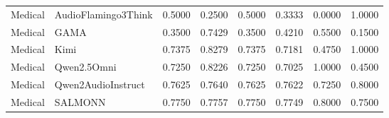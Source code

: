 \begin{table}
\begin{tabular}{llllllll}
Medical & AudioFlamingo3Think & 0.5000 & 0.2500 & 0.5000 & 0.3333 & 0.0000 & 1.0000 \\
Medical & GAMA & 0.3500 & 0.7429 & 0.3500 & 0.4210 & 0.5500 & 0.1500 \\
Medical & Kimi & 0.7375 & 0.8279 & 0.7375 & 0.7181 & 0.4750 & 1.0000 \\
Medical & Qwen2.5Omni & 0.7250 & 0.8226 & 0.7250 & 0.7025 & 1.0000 & 0.4500 \\
Medical & Qwen2AudioInstruct & 0.7625 & 0.7640 & 0.7625 & 0.7622 & 0.7250 & 0.8000 \\
Medical & SALMONN & 0.7750 & 0.7757 & 0.7750 & 0.7749 & 0.8000 & 0.7500 \\
\bottomrule
\end{tabular}
\end{table}

